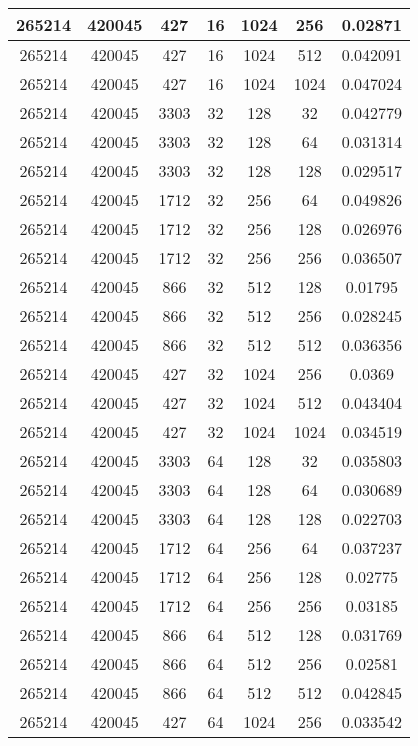 \documentclass[9pt]{article}
\begin{document}
\begin{tabular}{|c|c|c|c|c|c|c| }
\hline
265214  & 420045  & 427  & 16  & 1024  & 256  & 0.02871 \\
\hline
265214  & 420045  & 427  & 16  & 1024  & 512  & 0.042091 \\
\hline
265214  & 420045  & 427  & 16  & 1024  & 1024  & 0.047024 \\
\hline
265214  & 420045  & 3303  & 32  & 128  & 32  & 0.042779 \\
\hline
265214  & 420045  & 3303  & 32  & 128  & 64  & 0.031314 \\
\hline
265214  & 420045  & 3303  & 32  & 128  & 128  & 0.029517 \\
\hline
265214  & 420045  & 1712  & 32  & 256  & 64  & 0.049826 \\
\hline
265214  & 420045  & 1712  & 32  & 256  & 128  & 0.026976 \\
\hline
265214  & 420045  & 1712  & 32  & 256  & 256  & 0.036507 \\
\hline
265214  & 420045  & 866  & 32  & 512  & 128  & 0.01795 \\
\hline
265214  & 420045  & 866  & 32  & 512  & 256  & 0.028245 \\
\hline
265214  & 420045  & 866  & 32  & 512  & 512  & 0.036356 \\
\hline
265214  & 420045  & 427  & 32  & 1024  & 256  & 0.0369 \\
\hline
265214  & 420045  & 427  & 32  & 1024  & 512  & 0.043404 \\
\hline
265214  & 420045  & 427  & 32  & 1024  & 1024  & 0.034519 \\
\hline
265214  & 420045  & 3303  & 64  & 128  & 32  & 0.035803 \\
\hline
265214  & 420045  & 3303  & 64  & 128  & 64  & 0.030689 \\
\hline
265214  & 420045  & 3303  & 64  & 128  & 128  & 0.022703 \\
\hline
265214  & 420045  & 1712  & 64  & 256  & 64  & 0.037237 \\
\hline
265214  & 420045  & 1712  & 64  & 256  & 128  & 0.02775 \\
\hline
265214  & 420045  & 1712  & 64  & 256  & 256  & 0.03185 \\
\hline
265214  & 420045  & 866  & 64  & 512  & 128  & 0.031769 \\
\hline
265214  & 420045  & 866  & 64  & 512  & 256  & 0.02581 \\
\hline
265214  & 420045  & 866  & 64  & 512  & 512  & 0.042845 \\
\hline
265214  & 420045  & 427  & 64  & 1024  & 256  & 0.033542 \\

\end{tabular}
\end{document}
